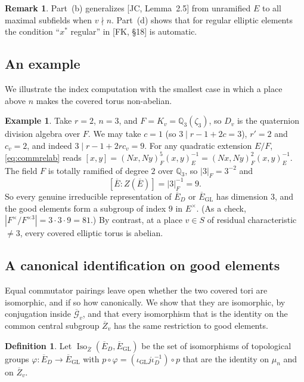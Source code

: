 \documentclass[12pt]{article}
\newcommand{\ov}[1]{\overline{#1}}
\newcommand{\Q}{\mathbb{Q}}
\newcommand{\Iso}{\operatorname{Iso}}
\newcommand{\GL}{\mathrm{GL}}
\newcommand{\Zb}{\ov{Z}}
\newcommand{\Eb}{\ov{E}}
\newcommand{\cGb}{\ov{\mathcal{G}}}
\newcommand{\iD}{\iota_D}
\newcommand{\iG}{\iota_{\GL}}
\theoremstyle{plain}
\theoremstyle{definition}
\newtheorem{definition}[theorem]{Definition}
\newtheorem{remark}[theorem]{Remark}
\newtheorem{example}[theorem]{Example}
\begin{document}
\begin{remark}
Part~(b) generalizes [JC, Lemma~2.5] from unramified $E$ to all maximal subfields when $v\nmid n$. Part~(d) shows that for regular elliptic elements the condition ``$x^*$ regular'' in [FK, \S18] is automatic.
\end{remark}

\subsection{An example}\label{subsec:example}
We illustrate the index computation with the smallest case in which a place above $n$ makes the covered torus non-abelian.

\begin{example}\label{ex:r2n3}
Take $r=2$, $n=3$, and $F=K_v=\Q_3(\zeta_3)$, so $D_v$ is the quaternion division algebra over $F$. We may take $c=1$ (so $3\mid r-1+2c=3$), $r'=2$ and $c_v=2$, and indeed $3\mid r-1+2rc_v=9$. For any quadratic extension $E/F$, \eqref{eq:commrelab} reads $[x,y]=(Nx,Ny)_F^{5}(x,y)_E^{-1}=(Nx,Ny)_F^{2}(x,y)_E^{-1}$. The field $F$ is totally ramified of degree $2$ over $\Q_3$, so $|3|_F=3^{-2}$ and
\[ [\Eb:Z(\Eb)]=|3|_F^{-1}=9. \]
So every genuine irreducible representation of $\Eb_D$ or $\Eb_{\GL}$ has dimension $3$, and the good elements form a subgroup of index $9$ in $E^\times$. (As a check, $|F^\times/F^{\times3}|=3\cdot3\cdot9=81$.) By contrast, at a place $v\in S$ of residual characteristic $\ne3$, every covered elliptic torus is abelian.
\end{example}

\subsection{A canonical identification on good elements}\label{subsec:ident}
Equal commutator pairings leave open whether the two covered tori are isomorphic, and if so how canonically. We show that they are isomorphic, by conjugation inside $\cGb_v$, and that every isomorphism that is the identity on the common central subgroup $\Zb_v$ has the same restriction to good elements.

\begin{definition}
Let $\Iso_{\Zb}(\Eb_D,\Eb_{\GL})$ be the set of isomorphisms of topological groups $\varphi:\Eb_D\to\Eb_{\GL}$ with $p\circ\varphi=(\iG j\iD^{-1})\circ p$ that are the identity on $\mu_n$ and on $\Zb_v$.
\end{definition}
\end{document}
